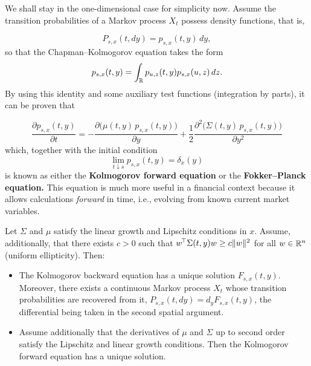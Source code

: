 We shall stay in the one-dimensional case for simplicity now. Assume the transition probabilities of a Markov process $X_t$ possess density functions, that is,

\begin{equation}
    P_{s,x}(t,dy) = p_{s,x}(t,y)\, dy,
\end{equation}
so that the Chapman--Kolmogorov equation takes the form 
\begin{equation}
    p_{s,x}(t,y) = \int_ {\mathbb{R}}p_{u,z}(t,y)p_{s,x}(u,z)\, dz.
\end{equation}
By using this identity and some auxiliary test functions (integration by parts), it can be proven that

\begin{equation}
    \frac{\partial p_{s,x}(t,y)}{\partial t}  = -\frac{\partial \bigl(\mu(t,y)\, p_{s,x}(t,y)\bigr)}{\partial y} +\frac 1 2 \frac{\partial^2 \bigl(\Sigma(t,y)\,p_{s,x}(t,y)\bigr)}{\partial y^2} \label{eq:fokkerplanck}
\end{equation}
which, together with the initial condition
\begin{equation}
    \lim_{t\downarrow s}p_{s,x}(t,y) = \delta_{x}(y)
\end{equation}
is known as either the \textbf{Kolmogorov forward equation} or the \textbf{Fokker--Planck equation.} This equation is much more useful in a financial context because it allows calculations \textit{forward} in time, i.e., evolving from known current market variables.

\begin{theorem}\label{thm:kolmogorovwellposed}
    Let $\Sigma$ and $\mu$ satisfy the linear growth and Lipschitz conditions in $x.$ Assume, additionally, that there exists $c>0$ such that $w^{\!\top}\Sigma(t,y)w \geq c\lVert w \rVert ^2 $
for all $w\in \mathbb{R}^n$ (uniform ellipticity). Then:

\begin{itemize}
    \item[a)] The Kolmogorov backward equation has a unique solution $F_{s,x}(t,y)$. Moreover, there exists a continuous Markov process $X_t$ whose transition probabilities are recovered from it, $P_{s,x}(t,dy) = d_y F_{s,x}(t,y)$, the differential being taken in the second spatial argument.
    \item[b)] Assume additionally that the derivatives of $\mu$ and $\Sigma$ up to second order satisfy the Lipschitz and linear growth conditions. Then the Kolmogorov forward equation has a unique solution.
\end{itemize}
\qedopen
\end{theorem}


